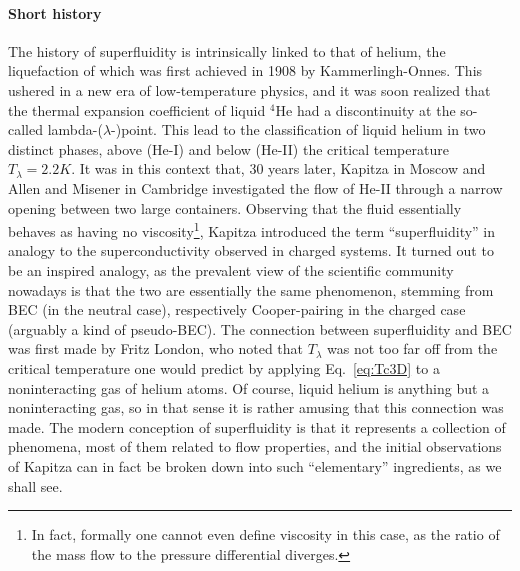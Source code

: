 \paragraph{Short history}
The history of superfluidity is intrinsically linked to that of helium,
the liquefaction of which was first achieved in 1908 by
Kammerlingh-Onnes. This ushered in a new era of low-temperature
physics, and it was soon realized that the thermal expansion
coefficient of liquid ${}^4$He had a discontinuity at the so-called
lambda-($\lambda$-)point. This lead to the classification of liquid
helium in two distinct phases, above (He-I) and below (He-II) the
critical temperature $T_{\lambda} = 2.2K$. It was in this context
that, 30 years later, Kapitza in Moscow and Allen and Misener in
Cambridge investigated the flow of He-II through a narrow opening
between two large containers. Observing that the fluid essentially
behaves as having no viscosity\footnote{In fact, formally one cannot
  even define viscosity in this case, as the ratio of the mass flow to
  the pressure differential diverges.}, Kapitza introduced the term
``superfluidity'' in analogy to the superconductivity observed in
charged systems. It turned out to be an inspired analogy, as the
prevalent view of the scientific community nowadays is that the two
are essentially the same phenomenon, stemming from BEC (in the neutral
case), respectively Cooper-pairing in the charged case (arguably a
kind of pseudo-BEC). The connection between superfluidity and BEC was
first made by Fritz London, who noted that $T_{\lambda}$ was not too
far off from the critical temperature one would predict by applying
Eq.~\eqref{eq:Tc3D} to a noninteracting gas of helium atoms. Of
course, liquid helium is anything but a noninteracting gas, so in that
sense it is rather amusing that this connection was made. The modern
conception of superfluidity is that it represents a collection of
phenomena, most of them related to flow properties, and the initial
observations of Kapitza can in fact be broken down into such
``elementary'' ingredients, as we shall see.

